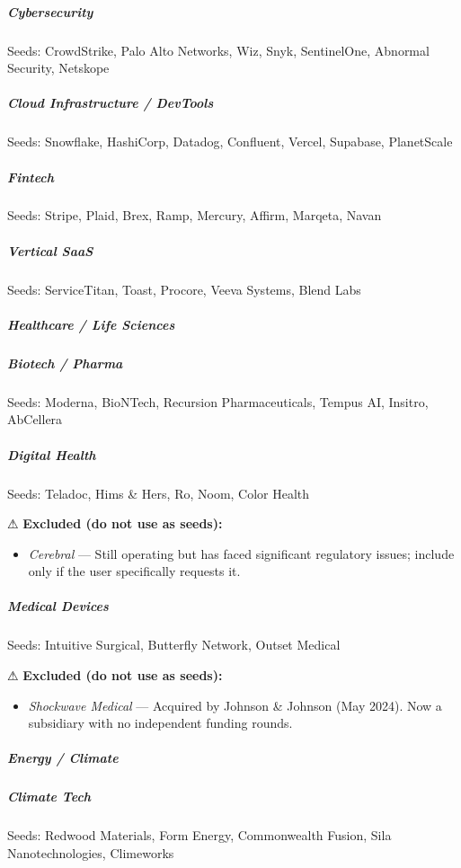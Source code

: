 \documentclass[11pt]{article}
\begin{document}
\subparagraph{Cybersecurity}\mbox{}\par
Seeds: CrowdStrike, Palo Alto Networks, Wiz, Snyk, SentinelOne, Abnormal Security, Netskope


\subparagraph{Cloud Infrastructure / DevTools}\mbox{}\par
Seeds: Snowflake, HashiCorp, Datadog, Confluent, Vercel, Supabase, PlanetScale


\subparagraph{Fintech}\mbox{}\par
Seeds: Stripe, Plaid, Brex, Ramp, Mercury, Affirm, Marqeta, Navan


\subparagraph{Vertical SaaS}\mbox{}\par
Seeds: ServiceTitan, Toast, Procore, Veeva Systems, Blend Labs


\subparagraph{Healthcare / Life Sciences}\mbox{}\par

\subparagraph{Biotech / Pharma}\mbox{}\par
Seeds: Moderna, BioNTech, Recursion Pharmaceuticals, Tempus AI, Insitro, AbCellera


\subparagraph{Digital Health}\mbox{}\par
Seeds: Teladoc, Hims \& Hers, Ro, Noom, Color Health


⚠ \textbf{Excluded (do not use as seeds):}

\begin{itemize}[leftmargin=*,itemsep=2pt,topsep=2pt]
\item {} \emph{Cerebral} — Still operating but has faced significant regulatory issues; include only if the user specifically requests it.
\end{itemize}

\subparagraph{Medical Devices}\mbox{}\par
Seeds: Intuitive Surgical, Butterfly Network, Outset Medical


⚠ \textbf{Excluded (do not use as seeds):}

\begin{itemize}[leftmargin=*,itemsep=2pt,topsep=2pt]
\item {} \emph{Shockwave Medical} — Acquired by Johnson \& Johnson (May 2024). Now a subsidiary with no independent funding rounds.
\end{itemize}

\subparagraph{Energy / Climate}\mbox{}\par

\subparagraph{Climate Tech}\mbox{}\par
Seeds: Redwood Materials, Form Energy, Commonwealth Fusion, Sila Nanotechnologies, Climeworks
\end{document}

